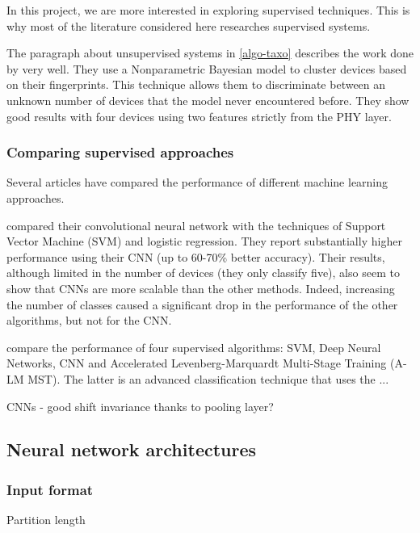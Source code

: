 In this project, we are more interested in exploring supervised techniques. This is why most of the literature considered here researches supervised systems.

The paragraph about unsupervised systems in \autoref{algo-taxo} describes the work done by \textcite{nguyen_device_2011} very well. They use a Nonparametric Bayesian model to cluster devices based on their fingerprints. This technique allows them to discriminate between an unknown number of devices that the model never encountered before. They show good results with four devices using two features strictly from the PHY layer.

\subsubsection{Comparing supervised approaches}

Several articles have compared the performance of different machine learning approaches.

\textcite{riyaz_deep_2018} compared their convolutional neural network with the techniques of Support Vector Machine (SVM) and logistic regression. They report substantially higher performance using their CNN (up to 60-70\% better accuracy). Their results, although limited in the number of devices (they only classify five), also seem to show that CNNs are more scalable than the other methods. Indeed, increasing the number of classes caused a significant drop in the performance of the other algorithms, but not for the CNN.

\textcite{youssef_machine_2017} compare the performance of four supervised algorithms: SVM, Deep Neural Networks, CNN and Accelerated Levenberg-Marquardt Multi-Stage Training (A-LM MST). The latter is an advanced classification technique that uses the ...


CNNs - good shift invariance thanks to pooling layer?

\subsection{Neural network architectures} \label{nn-architecture}

\subsubsection{Input format} \label{input-layer}

Partition length \cite{youssef_machine_2017}
